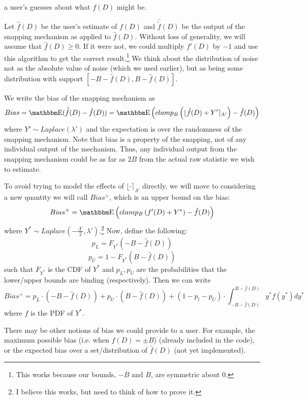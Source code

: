 \documentclass[11pt]{scrartcl} %
\begin{document}
a user's guesses about what $f(D)$ might be. \newline

Let $\hat{f}(D)$ be the user's estimate of $f(D)$ and $\hat{\tilde{f}}(D)$ be the output of the snapping mechanism as applied to
$\hat{f}(D)$. Without loss of generality, we will assume that $\hat{f}(D) \geq 0$. If it were not, we could
multiply $f'(D)$ by $-1$ and use this algorithm to get the correct result.\footnote{This works because our bounds, $-B \text{ and } B$, are symmetric about $0$.}
We think about the distribution of noise not as the absolute value of noise (which we used earlier), but as
being some distribution with support $[-B - \hat{f}(D), B - \hat{f}(D)]$. \newline

We write the bias of the snapping mechanism as
\[ Bias = \E(\hat{\tilde{f}}(D) - \hat{f}(D)) = \E\left( clamp_B\left( \lfloor \hat{f}(D) + Y' \rceil_{\Lambda'} \right) - \hat{f}(D) \right) \]
where $Y' \sim Laplace(\lambda')$ and the expectation is over the randomness of the snapping mechanism.
Note that bias is a property of the snapping, not of any individual output of the mechanism.
Thus, any individual output from the snapping mechanism could be as far as $2B$ from the actual raw statistic
we wish to estimate. \newline

To avoid trying to model the effects of $\lfloor \cdot \rceil_{\Lambda'}$ directly, we will move to considering
a new quantity we will call $Bias^{+}$, which is an upper bound on the bias:
\[ Bias^{+} = \E\left( clamp_B\left( f'(D) + Y^{*} \right) - \hat{f}(D) \right) \]
where $Y^{*} \sim Laplace(-\frac{\Lambda'}{2}, \lambda')$.\footnote{I believe this works,
but need to think of how to prove it.} Now, define the following:
\[ p_L = F_{Y^*}(-B - \hat{f}(D)) \]
\[ p_U = 1 - F_{Y^*}(B - \hat{f}(D)) \]
such that $F_{Y^*}$ is the CDF of $Y^*$ and $p_L, p_U$ are the probabilities that the lower/upper bounds are binding (respectively).
Then we can write
\[ Bias^+ = p_L \cdot (-B - \hat{f}(D)) + p_U \cdot (B - \hat{f}(D)) + (1-p_l-p_U) \cdot \int_{-B-\hat{f}(D)}^{B-\hat{f}(D)}y^* f(y^*) dy^* \]
where $f$ is the PDF of $Y^*$. \newline

There may be other notions of bias we could provide to a user. For example, the maximum possible bias
(i.e. when $f(D) = \pm B$) (already included in the code), or the expected bias over a set/distribution of $\hat{f}(D)$ (not
yet implemented).
\end{document}
